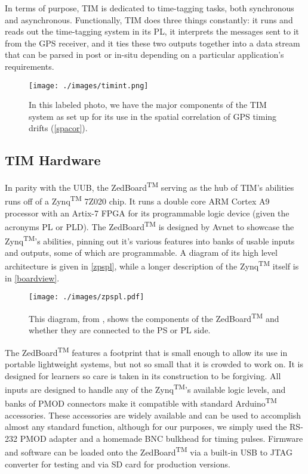 In terms of purpose, TIM is dedicated to time-tagging tasks, both synchronous and asynchronous. Functionally, TIM does three things constantly: it runs and reads out the time-tagging system in its PL, it interprets the messages sent to it from the GPS receiver, and it ties these two outputs together into a data stream that can be parsed in post or in-situ depending on a particular application's requirements.
\begin{figure}[H]
\centering
\texttt{[image: ./images/timint.png]}
\caption[TIM Internals Diagram]{In this labeled photo, we have the major components of the TIM system as set up for its use in the spatial correlation of GPS timing drifts (\autoref{spacor}).}
\label{timint}
\end{figure}
\subsection{TIM Hardware}
In parity with the UUB, the ZedBoard\textsuperscript{TM} serving as the hub of TIM's abilities runs off of a Zynq\textsuperscript{TM} 7Z020 chip. It runs a double core ARM Cortex A9 processor with an Artix-7 FPGA for its programmable logic device (given the acronyms PL or PLD). The ZedBoard\textsuperscript{TM} is designed by Avnet to showcase the Zynq\textsuperscript{TM}'s abilities, pinning out it's various features into banks of usable inputs and outputs, some of which are programmable. A diagram of its high level architecture is given in \autoref{zpspl}, while a longer description of the Zynq\textsuperscript{TM} itself is in \autoref{boardview}.

\begin{figure}[h!]
\centering
\texttt{[image: ./images/zpspl.pdf]}
\caption[Zynq PS/PL Programmability Diagram]{This diagram, from \textcite{zbspec}, shows the components of the ZedBoard\textsuperscript{TM} and whether they are connected to the PS or PL side.}
\label{zpspl}
\end{figure}

The ZedBoard\textsuperscript{TM} features a footprint that is small enough to allow its use in portable lightweight systems, but not so small that it is crowded to work on. It is designed for learners so care is taken in its construction to be forgiving. All inputs are designed to handle any of the Zynq\textsuperscript{TM}'s available logic levels, and banks of PMOD connectors make it compatible with standard Arduino\textsuperscript{TM} accessories. These accessories are widely available and can be used to accomplish almost any standard function, although for our purposes, we simply used the RS-232 PMOD adapter and a homemade BNC bulkhead for timing pulses. Firmware and software can be loaded onto the ZedBoard\textsuperscript{TM} via a built-in USB to JTAG converter for testing and via SD card for production versions.


